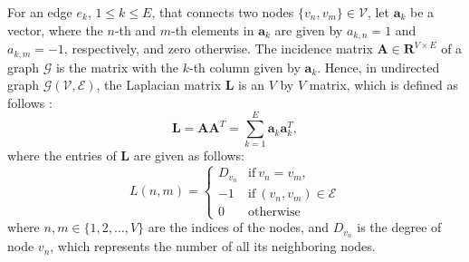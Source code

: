 \documentclass[conference]{IEEEtran}
\begin{document}
For an edge $e_{k}$, $ 1 \leq k \leq E$, that connects two nodes $\{v_n, v_m\} \in \mathcal V$, let $\mathbf a_k$ be a vector, where the $n$-th and $m$-th elements in $\mathbf a_k$ are given by $a_{k,n}=1$ and $a_{k,m}=-1$, respectively, and zero otherwise. The incidence matrix $\mathbf A \in \mathbf R^{V\times E}$ of a graph $\mathcal G$ is the matrix with the $k$-th column given by $\mathbf a_k$.  Hence, in undirected graph $\mathcal G(\mathcal V, \mathcal E)$, the Laplacian matrix $\mathbf L$ is an $V$ by $V$ matrix, which is defined as follows \cite{4657335}:
\begin{equation}
\mathbf L= \mathbf A \mathbf A^T=\sum^{E}_{k=1} \mathbf a_k \mathbf a^T_k,
\end{equation}
where the entries of $\mathbf L$ are given as follows:%
\begin{equation}
L(n,m) = \begin{cases}
D_{v_n} &\text{if} ~v_n=v_m,\\
-1 &\text{if}~ (v_n, v_m) \in \mathcal E \\
0 & \text{otherwise}
\end{cases}
\end{equation}
where $n, m \in \{1, 2, \ldots, V\}$ are the indices of the nodes, and $D_{v_n}$ is the degree of node $v_n$, which represents the number of all its neighboring nodes. 
\end{document}
